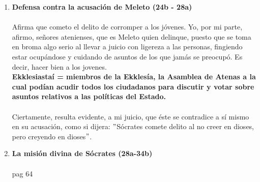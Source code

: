 \begin{multicols}{2}
\begin{enumerate}[\bfseries 1.]
    \item \textbf{Defensa contra la acusación de Meleto (24b - 28a)}\\\\

	Afirma que cometo el delito de corromper a los jóvenes. Yo, por mi parte, afirmo, señores atenienses, que es Meleto quien delinque, puesto que se toma en broma algo serio al llevar a juicio con ligereza a las personas, fingiendo estar ocupándose y cuidando de asuntos de los que jamás se preocupó. Es decir, hacer bien a los jovenes. \\
	\textbf{Ekklesiastaí = miembros de la Ekklesía, la Asamblea de Atenas a la cual podían acudir todos los ciudadanos para discutir y votar sobre asuntos relativos a las políticas del Estado.}\\\\ 
	Ciertamente, resulta evidente, a mi juicio, que éste se contradice a sí mismo en su acusación, como si dijera: $"$Sócrates comete delito al no creer en dioses, pero creyendo en dioses$"$.\\

    \item \textbf{La misión divina de Sócrates (28a-34b)}\\\\
	pag 64


    \end{enumerate}

\end{multicols}
